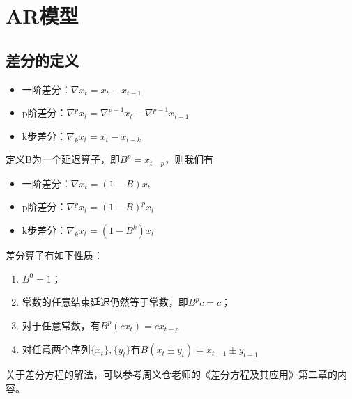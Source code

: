 \documentclass[12pt, a4paper, oneside]{ctexbook}
\begin{document}
\section{AR模型}
\subsection{差分的定义}
\begin{itemize}
    \item 一阶差分：$\nabla x_t = x_t - x_{t-1}$
    \item p阶差分：$\nabla^p x_t = \nabla^{p-1} x_t - \nabla^{p-1} x_{t-1}$
    \item k步差分：$\nabla_k x_t = x_t - x_{t-k}$
\end{itemize}
定义B为一个延迟算子，即$B^p = x_{t-p}$，则我们有
\begin{itemize}
    \item 一阶差分：$\nabla x_t = (1-B)x_t$
    \item p阶差分：$\nabla^{p} x_t = (1-B)^{p}x_t$
    \item k步差分：$\nabla_k x_t = (1-B^k)x_t$
\end{itemize}

差分算子有如下性质：
\begin{enumerate}[1、]
    \item $B^0 = 1$；
    \item 常数的任意结束延迟仍然等于常数，即$B^p c = c$；
    \item 对于任意常数，有$B^p (cx_t) = cx_{t-p}$
    \item 对任意两个序列$\{x_t\},\{y_t\}$有$B(x_t \pm y_t) = x_{t-1} \pm y_{t-1}$
\end{enumerate}

关于差分方程的解法，可以参考周义仓老师的《差分方程及其应用》第二章的内容。
\end{document}
